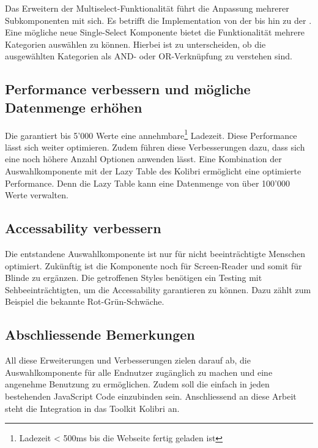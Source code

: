 Das Erweitern der Multiselect-Funktionalität führt die Anpassung mehrerer Subkomponenten mit sich.
Es betrifft die Implementation von der  bis hin zu der .
Eine mögliche neue Single-Select Komponente bietet die Funktionalität mehrere Kategorien auswählen zu können.
Hierbei ist zu unterscheiden, ob die ausgewählten Kategorien als AND- oder OR-Verknüpfung zu verstehen sind.


\subsection{Performance verbessern und mögliche Datenmenge erhöhen}
\label{sec:betterPerformance}

Die  garantiert bis 5'000 Werte eine annehmbare\footnote{
    Ladezeit < 500ms bis die Webseite fertig geladen ist
} Ladezeit.
Diese Performance lässt sich weiter optimieren.
Zudem führen diese Verbesserungen dazu, dass sich eine noch höhere Anzahl Optionen anwenden lässt.
Eine Kombination der Auswahlkomponente mit der Lazy Table des Kolibri ermöglicht eine optimierte Performance.
Denn die Lazy Table kann eine Datenmenge von über 100'000 Werte verwalten.


\subsection{Accessability verbessern}
\label{sec:betterAccessability}

Die entstandene Auswahlkomponente ist nur für nicht beeinträchtigte Menschen optimiert.
Zukünftig ist die Komponente noch für Screen-Reader und somit für Blinde zu ergänzen.
Die getroffenen Styles benötigen ein Testing mit Sehbeeinträchtigten, um die Accessability garantieren zu können.
Dazu zählt zum Beispiel die bekannte Rot-Grün-Schwäche.


\subsection{Abschliessende Bemerkungen}
\label{sec:endSumup}

All diese Erweiterungen und Verbesserungen zielen darauf ab, die Auswahlkomponente für alle Endnutzer zugänglich zu machen und eine angenehme Benutzung zu ermöglichen.
Zudem soll die  einfach in jeden bestehenden JavaScript Code einzubinden sein. 
Anschliessend an diese Arbeit steht die Integration in das Toolkit Kolibri an.
